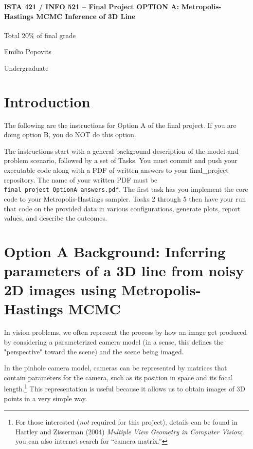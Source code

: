 \documentclass[10pt]{article}
\begin{document}
\begin{center}
    {\Large {\bf ISTA 421 / INFO 521 -- Final Project OPTION A: Metropolis-Hastings MCMC Inference of 3D Line}} \\
     \\
    Total 20\% of final grade \\
    \vspace{1cm}
\end{center}

\begin{flushright}
Emilio Popovits %

Undergraduate %
\end{flushright}

\section*{Introduction}

The following are the instructions for Option A of the final project. If you are doing option B, you do NOT do this option. 

The instructions start with a general background description of the model and problem scenario, followed by a set of Tasks. You must commit and push your executable code along with a PDF of written answers to your final\_project repository. The name of your written PDF must be {\tt final\_project\_OptionA\_answers.pdf}. The first task has you implement the core code to your Metropolis-Hastings sampler. Tasks 2 through 5 then have your run that code on the provided data in various configurations, generate plots, report values, and describe the outcomes.

\section*{Option A Background: Inferring parameters of a 3D line from noisy 2D images using Metropolis-Hastings MCMC}

In vision problems, we often represent the process by how an image get produced by considering a parameterized camera model (in a sense, this defines the "perspective" toward the scene) and the scene being imaged.

In the pinhole camera model, cameras can be represented by matrices that contain parameters for the camera, such as its position in space and its focal length.\footnote{For those interested ({\em not} required for this project), details can be found in Hartley and Zisserman (2004) {\em Multiple View Geometry in Computer Vision}; you can also internet search for ``camera matrix.''}  This representation is useful because it allows us to obtain images of 3D points in a very simple way.
\end{document}
